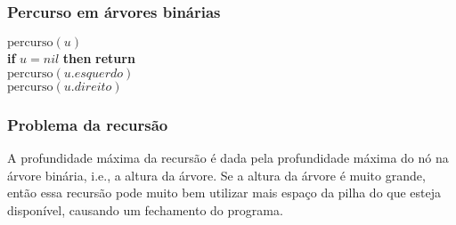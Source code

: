 \documentclass{beamer}
\begin{document}
\begin{frame}
\frametitle{Percurso em árvores binárias}
\begin{oframed}
\begin{flushleft}
\hspace*{1em} \ensuremath{\mathrm{percurso}(\ensuremath{\mathit{u}})}\\
\hspace*{1em} \hspace*{1em} {\color{black} \textbf{if}} \ensuremath{\ensuremath{\mathit{u}} =nil} {\color{black} \textbf{then}}  {\color{black} \textbf{return}}\\
\hspace*{1em} \hspace*{1em} \ensuremath{\mathrm{percurso}(\ensuremath{\mathit{u}}.\ensuremath{\mathit{esquerdo}})}\\
\hspace*{1em} \hspace*{1em} \ensuremath{\mathrm{percurso}(\ensuremath{\mathit{u}}.\ensuremath{\mathit{direito}})}\\
\end{flushleft}
\end{oframed}
\end{frame}

\begin{frame}
\frametitle{Problema da recursão}
A profundidade máxima da recursão é dada pela
profundidade máxima do nó na árvore binária, i.e., a altura da árvore.
Se a altura da árvore é muito grande, então essa recursão pode muito bem utilizar mais espaço da pilha do que esteja disponível, causando um fechamento do programa.
\end{frame}
\end{document}
